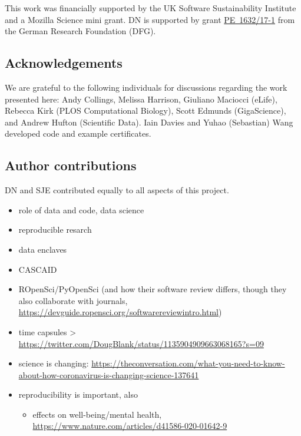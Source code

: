 \documentclass[12pt]{article}
\begin{document}
This work was financially supported by the UK Software
Sustainability Institute and a Mozilla Science mini grant.
DN is supported by grant
\href{https://gepris.dfg.de/gepris/projekt/415851837}{PE~1632/17-1}
from the German Research Foundation (DFG).

\subsection*{Acknowledgements}\label{acknowledgements}

We are grateful to the following individuals for discussions regarding
the work presented here: Andy Collings, Melissa Harrison, Giuliano
Maciocci (eLife), Rebecca Kirk (PLOS Computational Biology), Scott
Edmunds (GigaScience), and Andrew Hufton (Scientific Data). Iain Davies and
Yuhao (Sebastian) Wang developed code and example certificates.

\subsection*{Author contributions}

DN and SJE contributed equally to all aspects of this project.

{\small
}


\clearpage
\begin{itemize}
\item
  role of data and code, data science
\item
  reproducible resarch
\item
  data enclaves
\item
  CASCAID
\item
  ROpenSci/PyOpenSci (and how their software review differs, though they
  also collaborate with journals,
  \url{https://devguide.ropensci.org/softwarereviewintro.html})
\item
  time capsules \textgreater{}
  \url{https://twitter.com/DougBlank/status/1135904909663068165?s=09}
\item
  science is changing:
  \url{https://theconversation.com/what-you-need-to-know-about-how-coronavirus-is-changing-science-137641}
\item
  reproducibility is important, also

  \begin{itemize}
  \item
    effects on well-being/mental health,
    \url{https://www.nature.com/articles/d41586-020-01642-9}
  \end{itemize}
\end{itemize}
\end{document}
